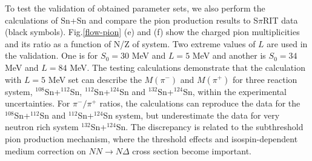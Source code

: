 \documentclass[reprint,aps,prc,twocolumn,superscriptaddress]{revtex4-1}
\begin{document}
To test the validation of obtained parameter sets, we also perform the calculations of Sn+Sn and compare the pion production results to S$\pi$RIT data (black symbols). Fig.\ref{flow-pion} (e) and (f)  show the charged pion multiplicities and its ratio as a function of N/Z of system. Two extreme values of $L$ are used in the validation. One is for $S_0=30$ MeV and $L=5$ MeV and another is $S_0=34$ MeV and $L=84$ MeV. The testing calculations demonstrate that the calculation with $L=5$ MeV set can describe the $M(\pi^-)$ and $M(\pi^+)$ for three reaction system, $^{108}$Sn+$^{112}$Sn, $^{112}$Sn+$^{124}$Sn and $^{132}$Sn+$^{124}$Sn, within the experimental uncertainties. For $\pi^-/\pi^+$ ratios, the calculations can reproduce the data for the $^{108}$Sn+$^{112}$Sn and $^{112}$Sn+$^{124}$Sn system, but underestimate the data for very neutron rich system $^{132}$Sn+$^{124}$Sn. The discrepancy is related to the subthreshold pion production mechanism, where the  threshold effects\cite{Ferini2005NPA,TSong2015PRC,ZhenZhang2017PRC} and isospin-dependent medium correction on $NN\to N\Delta$ cross section\cite{QFLi2017PLB,YCui2018PRC} become important.




\end{document}
